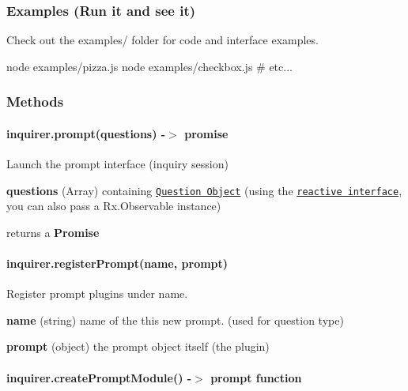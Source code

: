 \label{_examples}%
 \subsubsection*{Examples (Run it and see it)}

Check out the {\ttfamily examples/} folder for code and interface examples.


\begin{DoxyCode}
node examples/pizza.js
node examples/checkbox.js
# etc...
\end{DoxyCode}


\subsubsection*{Methods}

\label{_methods}%
 \paragraph*{{\ttfamily inquirer.\+prompt(questions) -\/$>$ promise}}

Launch the prompt interface (inquiry session)


\begin{DoxyItemize}
\item {\bfseries questions} (Array) containing \href{#question}{\tt Question Object} (using the \href{#reactive-interface}{\tt reactive interface}, you can also pass a {\ttfamily Rx.\+Observable} instance)
\item returns a {\bfseries Promise}
\end{DoxyItemize}

\paragraph*{{\ttfamily inquirer.\+register\+Prompt(name, prompt)}}

Register prompt plugins under {\ttfamily name}.


\begin{DoxyItemize}
\item {\bfseries name} (string) name of the this new prompt. (used for question {\ttfamily type})
\item {\bfseries prompt} (object) the prompt object itself (the plugin)
\end{DoxyItemize}

\paragraph*{{\ttfamily inquirer.\+create\+Prompt\+Module() -\/$>$ prompt function}}

